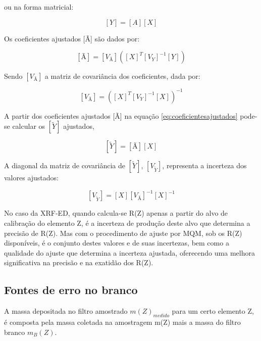 ou na forma matricial:

\begin{equation}
  \label{eq:polinomioMatriz}
  [Y] = [A][X]
\end{equation}

Os coeficientes ajustados [Ã] são dados por:

\begin{equation}
  \label{eq:coeficientesajustados}
  [Ã] = [V_{Ã}] ([X]^T {[V_Y]}^{-1} [Y])
\end{equation}

Sendo $[V_{Ã}]$ a matriz de covariância dos coeficientes, dada por:

\begin{equation}
  \label{eq:matrizcovariancia}
  [V_{Ã}] = ([X]^T [V_Y]^{-1} [X])^{-1}
\end{equation}

A partir dos coeficientes ajustados [Ã] na equação \ref{eq:coeficientesajustados} 
pode-se calcular os $[\tilde{Y}]$ ajustados,

\begin{equation}
  \label{eq:polinomioajustado}
  [\tilde{Y}] = [Ã][X]
\end{equation}

A diagonal da matriz de covariância de $[\tilde{Y}]$, $[V_{\tilde{Y}}]$, 
representa a incerteza dos valores ajustados:

\begin{equation}
  \label{eq:matrizcovarianciaY}
  [V_{\tilde{Y}}] = [X] [V_{Ã}]^{-1} [X]^{-1}
\end{equation}

No caso da XRF-ED, quando calcula-se R(Z) apenas a partir do alvo de 
calibração do elemento Z, é a incerteza de produção deste alvo que determina 
a precisão de R(Z). Mas com o procedimento de ajuste por MQM, sob os 
R(Z) disponíveis, é o conjunto destes valores e de suas incertezas, bem como a 
qualidade do ajuste que determina a incerteza ajustada, oferecendo uma 
melhora significativa na precisão e na exatidão dos R(Z).

\subsection{Fontes de erro no branco}

A massa depositada no filtro amostrado $m(Z)_{medido}$ para um certo elemento Z,
é composta pela massa coletada na amostragem m(Z) mais a massa do filtro 
branco $m_{B}(Z)$.

